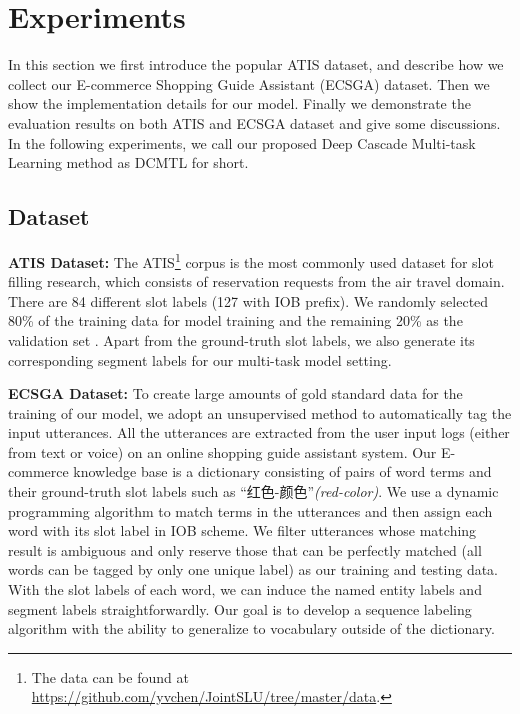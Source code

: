 \section{Experiments}
In this section we first introduce the popular ATIS dataset,
and describe how we collect our E-commerce Shopping Guide Assistant (ECSGA) dataset.
Then we show the implementation details for our model.
Finally we demonstrate the evaluation results on both ATIS and ECSGA dataset and give some discussions.
In the following experiments, we call our proposed Deep Cascade Multi-task Learning method as DCMTL for short.

\subsection{Dataset}
\label{sec:data}
\noindent
\textbf{ATIS Dataset:}
The ATIS\footnote{The data can be found at \url{https://github.com/yvchen/JointSLU/tree/master/data}.} corpus is the most commonly used dataset for slot filling research,
which consists of reservation requests from the air travel domain.
There are 84 different slot labels (127 with IOB prefix). 
We randomly selected 80\% of the training data for model training and the 
remaining 20\% as the validation set \cite{mesnil2015using}.
Apart from the ground-truth slot labels, we also generate its 
corresponding segment labels for our multi-task model setting.

\noindent
\textbf{ECSGA Dataset:}
To create large amounts of gold standard data 
for the training of our model,
we adopt an unsupervised method to 
automatically tag the input utterances.
All the utterances are extracted from the user input logs 
(either from text or voice) on an online shopping guide 
assistant system.  Our E-commerce knowledge base
is a dictionary consisting of pairs of
word terms and their ground-truth slot labels 
such as ``红色-颜色''\emph{(red-color)}.
We use a dynamic programming algorithm to 
match terms in the utterances and then assign each word with 
its slot label in IOB scheme.
We filter utterances whose matching result is
ambiguous and only reserve those that can be 
perfectly matched
(all words can be tagged by only one unique label) 
as our training and testing data.
With the slot labels of each word, we can induce the 
named entity labels and segment labels straightforwardly.
Our goal is to develop 
a sequence labeling algorithm with the ability to generalize to vocabulary
outside of the dictionary.

